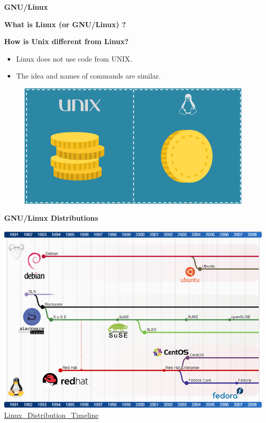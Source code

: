 \documentclass[ignorenonframetext,]{beamer}
\begin{document}
\begin{frame}{\textbf{GNU/Linux}}
\begin{block}{\textbf{What is Linux (or GNU/Linux) ?}}
\end{block}

\begin{block}{\textbf{How is Unix different from Linux?}}

\begin{itemize}
\item
  Linux does not use code from UNIX.
\item
  The idea and names of commands are similar.
\end{itemize}

\begin{figure}
\centering
\includegraphics{unix_linux.png}
\caption{}
\end{figure}

\end{block}

\begin{block}{\textbf{GNU/Linux Distributions}}

\includegraphics{linux_dist.png}
\href{https://upload.wikimedia.org/wikipedia/commons/1/1b/Linux_Distribution_Timeline.svg}{Linux\_Distribution\_Timeline}

\end{block}

\end{frame}
\end{document}
